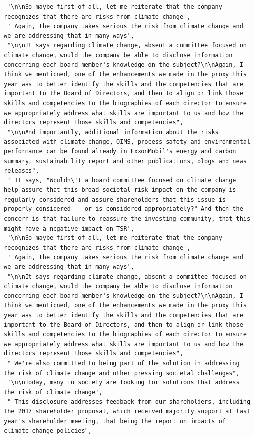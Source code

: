 \documentclass[
  letterpaper,
  DIV=11,
  numbers=noendperiod]{scrreprt}
\begin{document}
\begin{verbatim}
 '\n\nSo maybe first of all, let me reiterate that the company recognizes that there are risks from climate change',
 ' Again, the company takes serious the risk from climate change and we are addressing that in many ways',
 "\n\nIt says regarding climate change, absent a committee focused on climate change, would the company be able to disclose information concerning each board member's knowledge on the subject?\n\nAgain, I think we mentioned, one of the enhancements we made in the proxy this year was to better identify the skills and the competencies that are important to the Board of Directors, and then to align or link those skills and competencies to the biographies of each director to ensure we appropriately address what skills are important to us and how the directors represent those skills and competencies",
 "\n\nAnd importantly, additional information about the risks associated with climate change, OIMS, process safety and environmental performance can be found already in ExxonMobil's energy and carbon summary, sustainability report and other publications, blogs and news releases",
 ' It says, "Wouldn\'t a board committee focused on climate change help assure that this broad societal risk impact on the company is regularly considered and assure shareholders that this issue is properly considered -- or is considered appropriately?" And then the concern is that failure to reassure the investing community, that this might have a negative impact on TSR',
 '\n\nSo maybe first of all, let me reiterate that the company recognizes that there are risks from climate change',
 ' Again, the company takes serious the risk from climate change and we are addressing that in many ways',
 "\n\nIt says regarding climate change, absent a committee focused on climate change, would the company be able to disclose information concerning each board member's knowledge on the subject?\n\nAgain, I think we mentioned, one of the enhancements we made in the proxy this year was to better identify the skills and the competencies that are important to the Board of Directors, and then to align or link those skills and competencies to the biographies of each director to ensure we appropriately address what skills are important to us and how the directors represent those skills and competencies",
 " We're also committed to being part of the solution in addressing the risk of climate change and other pressing societal challenges",
 '\n\nToday, many in society are looking for solutions that address the risk of climate change',
 " This disclosure addresses feedback from our shareholders, including the 2017 shareholder proposal, which received majority support at last year's shareholder meeting, that being the report on impacts of climate change policies",

\end{verbatim}
\end{document}
